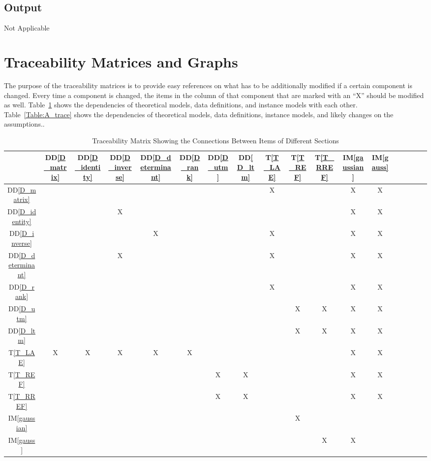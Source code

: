\documentclass[12pt]{article}
\newcommand{\ddref}[1]{DD\ref{#1}}
\newcommand{\tref}[1]{T\ref{#1}}
\newcommand{\iref}[1]{IM\ref{#1}}
\begin{document}
\subsection{Output} \label{sec_Output}

Not Applicable



\section{Traceability Matrices and Graphs}

The purpose of the traceability matrices is to provide easy references on what
has to be additionally modified if a certain component is changed. Every time a
component is changed, the items in the column of that component that are marked
with an ``X'' should be modified as well. Table~\ref{Table:trace} shows the
dependencies of theoretical models, data definitions, and instance models with
each other. Table~\ref{Table:A_trace} shows the dependencies of theoretical
models, data definitions, instance models, and likely changes on the
assumptions..




\begin{table}[h!]
\centering
\begin{tabular}{|c|c|c|c|c|c|c|c|c|c|c|c|c|c|c|c|c|c|}
\hline
	&\ddref{D_matrix} & \ddref{D_identity} & \ddref{D_inverse} & \ddref{D_determinant} & \ddref{D_rank} & \ddref{D_utm} & \ddref{D_ltm} & \tref{T_LAE} & \tref{T_REF} & \tref{T_RREF} & \iref{gaussian} & \iref{gauss} \\
\hline

\ddref{D_matrix}   & & & & & & & &X & & &X &X \\ \hline
\ddref{D_identity} & & &X & & & & & & & &X &X \\ \hline
\ddref{D_inverse}  & & & &X & & & &X & & &X &X\\ \hline
\ddref{D_determinant}   & & &X & & & & &X & & &X &X  \\ \hline
\ddref{D_rank}   & & & & & & & &X & & &X &X \\ \hline
\ddref{D_utm}    & & & & & & & & &X &X &X &X \\ \hline
\ddref{D_ltm}    & & & & & & & & &X &X &X &X \\ \hline
\tref{T_LAE}  &X &X &X &X &X & & & & & &X &X \\ \hline
\tref{T_REF}  & & & & & &X &X & & & &X &X \\ \hline
\tref{T_RREF}   & & & & & &X &X & & & &X &X  \\ \hline
\iref{gaussian}     & & & & & & & & &X & & &   \\ \hline
\iref{gauss}    & & & & & & & & & &X &X &  \\ \hline

\end{tabular}
\caption{Traceability Matrix Showing the Connections Between Items of Different Sections}
\label{Table:trace}
\end{table}
\end{document}
